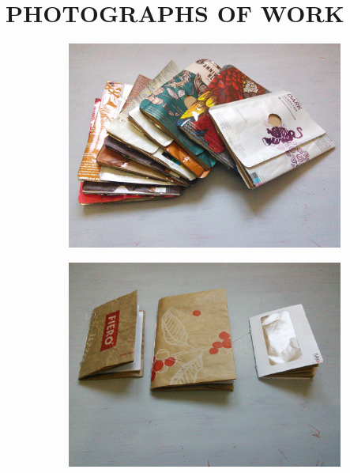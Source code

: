 \section{PHOTOGRAPHS OF WORK}


\begin{figure}
    \centering
    \begin{subfigure}[t]{0.47\textwidth}
        \includegraphics[width=\textwidth]{project_graphics/notebooks1.jpg}
    \end{subfigure}
    \begin{subfigure}[t]{0.47\textwidth}
        \includegraphics[width=\textwidth]{project_graphics/notebooks2.jpg}
    \end{subfigure}
    \label{fig:CollectedMaterials1}
\end{figure}